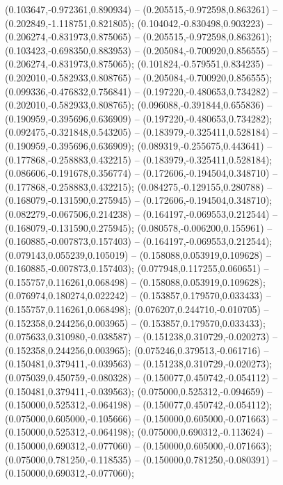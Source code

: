  (0.103647,-0.972361,0.890934) -- (0.205515,-0.972598,0.863261) -- (0.202849,-1.118751,0.821805);
 (0.104042,-0.830498,0.903223) -- (0.206274,-0.831973,0.875065) -- (0.205515,-0.972598,0.863261);
 (0.103423,-0.698350,0.883953) -- (0.205084,-0.700920,0.856555) -- (0.206274,-0.831973,0.875065);
 (0.101824,-0.579551,0.834235) -- (0.202010,-0.582933,0.808765) -- (0.205084,-0.700920,0.856555);
 (0.099336,-0.476832,0.756841) -- (0.197220,-0.480653,0.734282) -- (0.202010,-0.582933,0.808765);
 (0.096088,-0.391844,0.655836) -- (0.190959,-0.395696,0.636909) -- (0.197220,-0.480653,0.734282);
 (0.092475,-0.321848,0.543205) -- (0.183979,-0.325411,0.528184) -- (0.190959,-0.395696,0.636909);
 (0.089319,-0.255675,0.443641) -- (0.177868,-0.258883,0.432215) -- (0.183979,-0.325411,0.528184);
 (0.086606,-0.191678,0.356774) -- (0.172606,-0.194504,0.348710) -- (0.177868,-0.258883,0.432215);
 (0.084275,-0.129155,0.280788) -- (0.168079,-0.131590,0.275945) -- (0.172606,-0.194504,0.348710);
 (0.082279,-0.067506,0.214238) -- (0.164197,-0.069553,0.212544) -- (0.168079,-0.131590,0.275945);
 (0.080578,-0.006200,0.155961) -- (0.160885,-0.007873,0.157403) -- (0.164197,-0.069553,0.212544);
 (0.079143,0.055239,0.105019) -- (0.158088,0.053919,0.109628) -- (0.160885,-0.007873,0.157403);
 (0.077948,0.117255,0.060651) -- (0.155757,0.116261,0.068498) -- (0.158088,0.053919,0.109628);
 (0.076974,0.180274,0.022242) -- (0.153857,0.179570,0.033433) -- (0.155757,0.116261,0.068498);
 (0.076207,0.244710,-0.010705) -- (0.152358,0.244256,0.003965) -- (0.153857,0.179570,0.033433);
 (0.075633,0.310980,-0.038587) -- (0.151238,0.310729,-0.020273) -- (0.152358,0.244256,0.003965);
 (0.075246,0.379513,-0.061716) -- (0.150481,0.379411,-0.039563) -- (0.151238,0.310729,-0.020273);
 (0.075039,0.450759,-0.080328) -- (0.150077,0.450742,-0.054112) -- (0.150481,0.379411,-0.039563);
 (0.075000,0.525312,-0.094659) -- (0.150000,0.525312,-0.064198) -- (0.150077,0.450742,-0.054112);
 (0.075000,0.605000,-0.105666) -- (0.150000,0.605000,-0.071663) -- (0.150000,0.525312,-0.064198);
 (0.075000,0.690312,-0.113624) -- (0.150000,0.690312,-0.077060) -- (0.150000,0.605000,-0.071663);
 (0.075000,0.781250,-0.118535) -- (0.150000,0.781250,-0.080391) -- (0.150000,0.690312,-0.077060);
